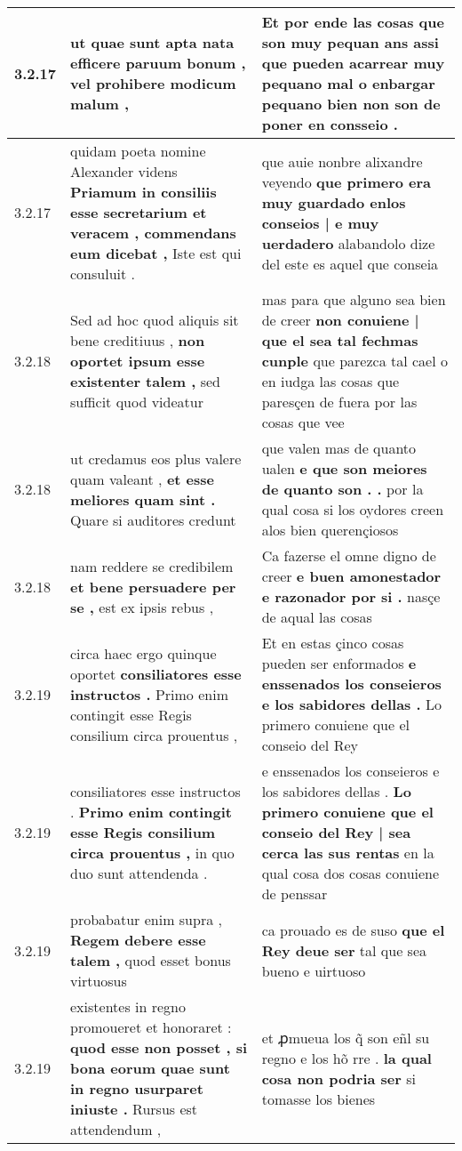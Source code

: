 \begin{tabular}{|p{1cm}|p{6.5cm}|p{6.5cm}|}
3.2.17 & ut quae sunt apta nata \textbf{ efficere paruum bonum , } vel prohibere modicum malum , & Et por ende las cosas que son muy pequan ans assi que pueden acarrear muy \textbf{ pequano mal o enbargar } pequano bien non son de poner en consseio . \\\hline
3.2.17 & quidam poeta nomine Alexander videns \textbf{ Priamum in consiliis esse secretarium et veracem , commendans eum dicebat , } Iste est qui consuluit . & que auie nonbre alixandre veyendo \textbf{ que primero era muy guardado enlos conseios | e muy uerdadero } alabandolo dize del este es aquel que conseia \\\hline
3.2.18 & Sed ad hoc quod aliquis sit bene creditiuus , \textbf{ non oportet ipsum esse existenter talem , } sed sufficit quod videatur & mas para que alguno sea bien de creer \textbf{ non conuiene | que el sea tal fechmas cunple } que parezca tal cael o en iudga las cosas que paresçen de fuera por las cosas que vee \\\hline
3.2.18 & ut credamus eos plus valere quam valeant , \textbf{ et esse meliores quam sint . } Quare si auditores credunt & que valen mas de quanto ualen \textbf{ e que son meiores de quanto son . . } por la qual cosa si los oydores creen alos bien querençiosos \\\hline
3.2.18 & nam reddere se credibilem \textbf{ et bene persuadere per se , } est ex ipsis rebus , & Ca fazerse el omne digno de creer \textbf{ e buen amonestador e razonador por si . } nasçe de aqual las cosas \\\hline
3.2.19 & circa haec ergo quinque oportet \textbf{ consiliatores esse instructos . } Primo enim contingit esse Regis consilium circa prouentus , & Et en estas çinco cosas pueden ser enformados \textbf{ e enssenados los conseieros e los sabidores dellas . } Lo primero conuiene que el conseio del Rey \\\hline
3.2.19 & consiliatores esse instructos . \textbf{ Primo enim contingit esse Regis consilium circa prouentus , } in quo duo sunt attendenda . & e enssenados los conseieros e los sabidores dellas . \textbf{ Lo primero conuiene que el conseio del Rey | sea cerca las sus rentas } en la qual cosa dos cosas conuiene de penssar \\\hline
3.2.19 & probabatur enim supra , \textbf{ Regem debere esse talem , } quod esset bonus virtuosus & ca prouado es de suso \textbf{ que el Rey deue ser } tal que sea bueno e uirtuoso \\\hline
3.2.19 & existentes in regno promoueret et honoraret : \textbf{ quod esse non posset , si bona eorum quae sunt in regno usurparet iniuste . } Rursus est attendendum , & et ꝓmueua los q̃ son eñl su regno e los hõ rre . \textbf{ la qual cosa non podria ser } si tomasse los bienes \\\hline

\end{tabular}
